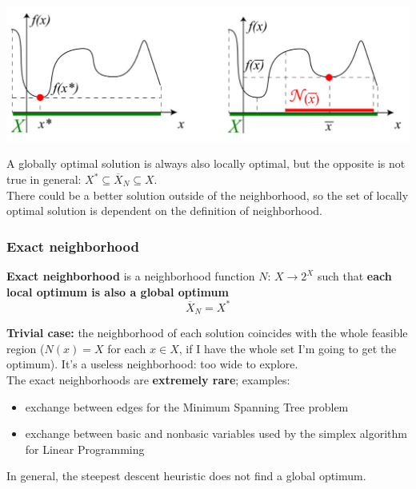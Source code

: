 \begin{center}
	\includegraphics[width=\columnwidth]{img/localOptimum}
\end{center}

A globally optimal solution is always also locally optimal, but the opposite is not true in general: $X^\ast \subseteq \overline{X}_N \subseteq X$.\\

There could be a better solution outside of the neighborhood, so the set of locally optimal solution is dependent on the definition of neighborhood.\\

\newpage

\subsubsection{Exact neighborhood}

\textbf{Exact neighborhood} is a neighborhood function $N : \, X \rightarrow 2^X$ such that \textbf{each local optimum is also a global optimum}
$$ \overline{X}_N = X^\ast $$

\textbf{Trivial case:} the neighborhood of each solution coincides with the whole feasible region ($N (x) = X$ for each $x \in X$, if I have the whole set I'm going to get the optimum). It's a useless neighborhood: too wide to explore.\\

The exact neighborhoods are \textbf{extremely rare}; examples: 
\begin{itemize}
	\item exchange between edges for the Minimum Spanning Tree problem
	
	\item exchange between basic and nonbasic variables used by the simplex algorithm for Linear Programming
\end{itemize}

In general, the steepest descent heuristic does not find a global optimum.\\

